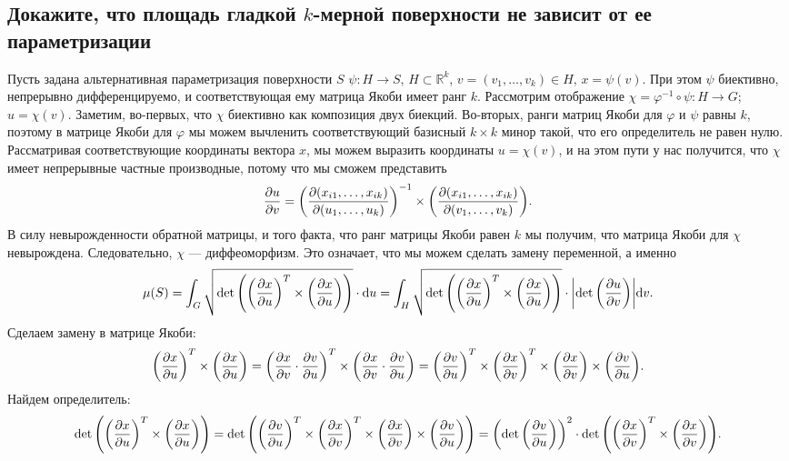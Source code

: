 
\subsection{Докажите, что площадь гладкой $k$-мерной поверхности не зависит от ее параметризации}

Пусть задана альтернативная параметризация поверхности $S$ $\psi \colon H \to S$, $H \subset \mathbb{R}^{k}$, $v = (v_{1}, \ldots, v_{k}) \in H$, $x = \psi(v)$.
При этом $\psi$ биективно, непрерывно дифференцируемо, и соответствующая ему матрица Якоби имеет ранг $k$.
Рассмотрим отображение $\chi = \varphi^{-1} \circ \psi \colon H \to G$; $u = \chi(v)$.
Заметим, во-первых, что $\chi$ биективно как композиция двух биекций.
Во-вторых, ранги матриц Якоби для $\varphi$ и $\psi$ равны $k$, поэтому в матрице Якоби для $\varphi$ мы можем вычленить соответствующий базисный $k \times k$ минор такой, что его определитель не равен нулю.
Рассматривая соответствующие координаты вектора $x$, мы можем выразить координаты $u = \chi(v)$, и на этом пути у нас получится, что $\chi$ имеет непрерывные частные производные, потому что мы сможем представить
\[
    \pdv{u}{v} = \pqty{\pdv{\pqty{x_{i1}, \ldots, x_{ik}}}{\pqty{u_{1}, \ldots, u_{k}}}}^{-1} \times \pqty{\pdv{\pqty{x_{i1}, \ldots, x_{ik}}}{\pqty{v_{1}, \ldots, v_{k}}}}.
\]
В силу невырожденности обратной матрицы, и того факта, что ранг матрицы Якоби равен $k$ мы получим, что матрица Якоби для $\chi$ невырождена.
Следовательно, $\chi$ --- диффеоморфизм.
Это означает, что мы можем сделать замену переменной, а именно
\[
    \mu(S) = \int_{G} \sqrt{\det\pqty{\pqty{\pdv{x}{u}}^{T} \times \pqty{\pdv{x}{u}}}} \cdot \dd u = \int_{H} \sqrt{\det\pqty{\pqty{\pdv{x}{u}}^{T} \times \pqty{\pdv{x}{u}}}} \cdot \abs{\det\pqty{\pdv{u}{v}}} \dd v.
\]
Сделаем замену в матрице Якоби:
\[
    \pqty{\pdv{x}{u}}^{T} \times \pqty{\pdv{x}{u}} = \pqty{\pdv{x}{v} \cdot \pdv{v}{u}}^{T} \times \pqty{\pdv{x}{v} \cdot \pdv{v}{u}} = \pqty{\pdv{v}{u}}^{T} \times \pqty{\pdv{x}{v}}^{T} \times \pqty{\pdv{x}{v}} \times \pqty{\pdv{v}{u}}.
\]
Найдем определитель:
\[
    \det \pqty{ \pqty{\pdv{x}{u}}^{T} \times \pqty{\pdv{x}{u}} } = \det \pqty{ \pqty{\pdv{v}{u}}^{T} \times \pqty{\pdv{x}{v}}^{T} \times \pqty{\pdv{x}{v}} \times \pqty{\pdv{v}{u}} } = \pqty{\det \pqty{\pdv{v}{u}}}^{2} \cdot \det \pqty{\pqty{\pdv{x}{v}}^{T} \times \pqty{\pdv{x}{v}}}.
\]
